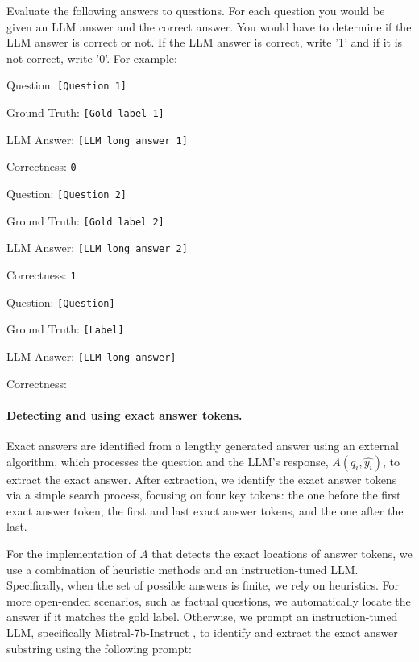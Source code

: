 \documentclass{article} %
\begin{document}
\begin{mdframed}[backgroundcolor=blue!5, skipabove=0.5\baselineskip]
\small
Evaluate the following answers to questions. For each question you would be given an LLM answer and the correct answer.
You would have to determine if the LLM answer is correct or not. If the LLM answer is correct, write '1' and if it is not correct, write '0'.
For example:

Question: \texttt{[Question 1]}

Ground Truth: \texttt{[Gold label 1]}

LLM Answer: \texttt{[LLM long answer 1]}

Correctness: \texttt{0}

Question: \texttt{[Question 2]}

Ground Truth: \texttt{[Gold label 2]}

LLM Answer:  \texttt{[LLM long answer 2]}

Correctness: \texttt{1}


Question: \texttt{[Question]}

Ground Truth: \texttt{[Label]}

LLM Answer: \texttt{[LLM long answer]}

Correctness:

\end{mdframed}

\paragraph{Detecting and using exact answer tokens.}
\label{app:exact_answer_impl}

Exact answers are identified from a lengthy generated answer using an external algorithm, which processes the question and the LLM’s response, $A(q_i, \hat{y_i})$, to extract the exact answer.
After extraction, we identify the exact answer tokens via a simple search process, focusing on four key tokens: the one before the first exact answer token, the first and last exact answer tokens, and the one after the last.

For the implementation of $A$ that detects the exact locations of answer tokens, we use a combination of heuristic methods and an instruction-tuned LLM.
Specifically, when the set of possible answers is finite, we rely on heuristics. For more open-ended scenarios, such as factual questions, we automatically locate the answer if it matches the gold label. Otherwise, we prompt an instruction-tuned LLM, specifically Mistral-7b-Instruct \citep{jiang2023mistral7b}, to identify and extract the exact answer substring using the following prompt:
\end{document}
